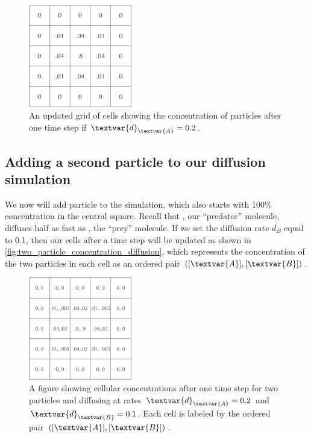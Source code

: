 \begin{figure}[h]
\centering
\mySfFamily
\includegraphics[width = 0.4\textwidth]{../images/A_concentration_slower_diffusion.png}
\caption{An updated grid of cells showing the concentration of  particles after one time step if $\textvar{d}_\textvar{A} = \text{0.2}$.}
\label{fig:A_concentration_slower_diffusion}
\end{figure}

\FloatBarrier
{}
\subsection{Adding a second particle to our diffusion simulation}

We now will add particle  to the simulation, which also starts with 100\% concentration in the central square. Recall that , our ``predator'' molecule, diffuses half as fast as , the ``prey'' molecule. If we set the diffusion rate $d_B$ equal to 0.1, then our cells after a time step will be updated as shown in \autoref{fig:two_particle_concentration_diffusion}, which represents the concentration of the two particles in each cell as an ordered pair $([\textvar{A}], [\textvar{B}])$.\\

\begin{figure}[h]
\centering
\mySfFamily
\includegraphics[width = 0.4\textwidth]{../images/two_particle_concentration_diffusion.png}
\caption{A figure showing cellular concentrations after one time step for two particles  and   diffusing at rates $\textvar{d}_\textvar{A} = \text{0.2}$ and $\textvar{d}_\textvar{B} = \text{0.1}$. Each cell is labeled by the ordered pair $([\textvar{A}], [\textvar{B}])$.}
\label{fig:two_particle_concentration_diffusion}
\end{figure}

